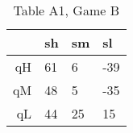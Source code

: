 \begin{table}[ht]
\centering
\begin{tabular}{rlll}
  \hline
 & sh & sm & sl \\ 
  \hline
qH &  61 &   6 & -39 \\ 
  qM &  48 &   5 & -35 \\ 
  qL &  44 &  25 &  15 \\ 
   \hline
\end{tabular}
\caption{Table A1, Game B} 
\end{table}

